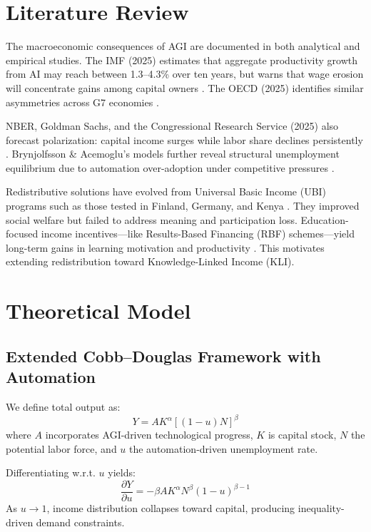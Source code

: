 \documentclass[10pt,a4paper]{article}
\begin{document}
\section{Literature Review}
The macroeconomic consequences of AGI are documented in both analytical and empirical studies. The IMF (2025) estimates that aggregate productivity growth from AI may reach between 1.3--4.3\% over ten years, but warns that wage erosion will concentrate gains among capital owners \cite{IMF2025}. The OECD (2025) identifies similar asymmetries across G7 economies \cite{OECD2025}. 

NBER, Goldman Sachs, and the Congressional Research Service (2025) also forecast polarization: capital income surges while labor share declines persistently \cite{CRS2025,Goldman2025}. Brynjolfsson \& Acemoglu’s models further reveal structural unemployment equilibrium due to automation over-adoption under competitive pressures \cite{SSRN2025}.

Redistributive solutions have evolved from Universal Basic Income (UBI) programs such as those tested in Finland, Germany, and Kenya \cite{Ubie2025,Give2024}. They improved social welfare but failed to address meaning and participation loss. Education-focused income incentives—like Results-Based Financing (RBF) schemes—yield long-term gains in learning motivation and productivity \cite{WorldBank2025,OECDedu2025}. This motivates extending redistribution toward Knowledge-Linked Income (KLI).

\section{Theoretical Model}

\subsection{Extended Cobb–Douglas Framework with Automation}
We define total output as:
\begin{equation}
Y = A K^{\alpha} [(1-u) N]^{\beta}
\end{equation}
where \( A \) incorporates AGI-driven technological progress, \( K \) is capital stock, \( N \) the potential labor force, and \( u \) the automation-driven unemployment rate.

Differentiating w.r.t. \( u \) yields:
\[
\frac{\partial Y}{\partial u} = -\beta A K^{\alpha} N^{\beta} (1-u)^{\beta-1}
\]
As \( u \to 1 \), income distribution collapses toward capital, producing inequality-driven demand constraints.
\end{document}
